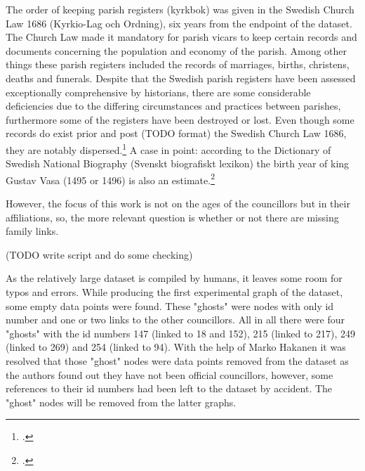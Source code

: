 \documentclass[a4paper,12pt]{article}
\begin{document}
\begin{onehalfspace}
The order of keeping parish registers (kyrkbok) was given in the Swedish Church Law 1686 (Kyrkio-Lag och Ordning), six years from the endpoint of the dataset. The Church Law made it mandatory for parish vicars to keep certain records and documents concerning the population and economy of the parish. Among other things these parish registers included the records of marriages, births, christens, deaths and funerals. Despite that the Swedish parish registers have been assessed exceptionally comprehensive by historians, there are some considerable deficiencies due to the differing circumstances and practices between parishes, furthermore some of the registers have been destroyed or lost. Even though some records do exist prior and post (TODO format) the Swedish Church Law 1686, they are notably dispersed.\footcite[p. 169-176.]{viikki94} A case in point: according to the Dictionary of Swedish National Biography (Svenskt biografiskt lexikon) the birth year of king Gustav Vasa (1495 or 1496) is also an estimate.\footcite{sbl_gustav_v} 

However, the focus of this work is not on the ages of the councillors but in their affiliations, so, the more relevant question is whether or not there are missing family links. 

(TODO write script and do some checking)

As the relatively large dataset is compiled by humans, it leaves some room for typos and errors. While producing the first experimental graph of the dataset, some empty data points were found. These "ghosts" were nodes with only id number and one or two links to the other councillors. All in all there were four "ghosts" with the id numbers 147 (linked to 18 and 152), 215 (linked to 217), 249 (linked to 269) and 254 (linked to 94). With the help of Marko Hakanen it was resolved that those "ghost" nodes were data points removed from the dataset as the authors found out they have not been official councillors, however, some references to their id numbers had been left to the dataset by accident. The "ghost" nodes will be removed from the latter graphs.

\printbibliography
\end{onehalfspace}
\end{document}
